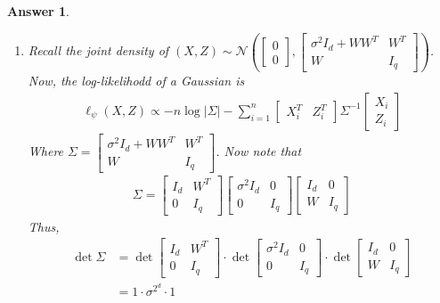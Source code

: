 \documentclass[12pt]{article}
\theoremstyle{colon}
\newtheorem*{answer}{Answer}
\begin{document}
\begin{answer}
\begin{enumerate}[label=\arabic*)]
    \item Recall the joint density of $(X, Z) \sim \mathcal{N} \left( \begin{bmatrix} 0 \\ 0 \end{bmatrix}, \begin{bmatrix} \sigma^2 I_d + W W^T & W^T \\ W & I_q \end{bmatrix} \right)$. Now, the log-likelihodd of a Gaussian is
      \begin{gather*}
        \ell_{\psi}(X, Z) \propto - n \log \lvert \Sigma \rvert - \sum_{i=1}^n \begin{bmatrix} X_i^T & Z_i^T \end{bmatrix} \Sigma^{-1} \begin{bmatrix} X_i \\ Z_i \end{bmatrix}
      \end{gather*}
      Where $\Sigma = \begin{bmatrix} \sigma^2 I_d + W W^T & W^T \\ W & I_q \end{bmatrix}$. Now note that
      \begin{gather*}
        \Sigma = \begin{bmatrix} I_d & W^T \\ 0 & I_q \end{bmatrix} \begin{bmatrix} \sigma^2 I_d & 0 \\ 0 & I_q \end{bmatrix} \begin{bmatrix} I_d & 0 \\ W & I_q \end{bmatrix}
      \end{gather*}
      Thus,
      \begin{align*}
        \det \Sigma &= \det \begin{bmatrix} I_d & W^T \\ 0 & I_q \end{bmatrix} \cdot \det \begin{bmatrix} \sigma^2 I_d & 0 \\ 0 & I_q \end{bmatrix} \cdot \det \begin{bmatrix} I_d & 0 \\ W & I_q \end{bmatrix} \\
        &= 1 \cdot \sigma^{2^d} \cdot 1 \\

\end{align*}
\end{enumerate}
\end{answer}
\end{document}
